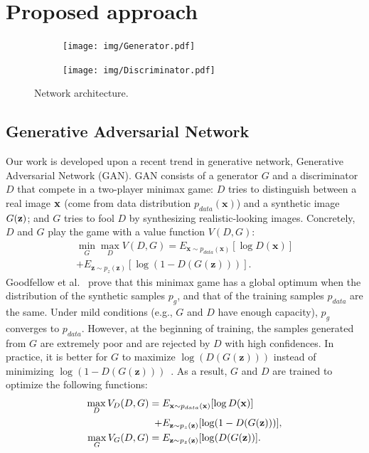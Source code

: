\documentclass[10pt,twocolumn,letterpaper]{article}
\begin{document}
\section{Proposed approach}
\begin{figure} [t!]
    \centering
    \begin{subfigure}[b]{0.48\textwidth}
        \texttt{[image: img/Generator.pdf]}
    \end{subfigure}
    \begin{subfigure}[b]{0.48\textwidth}
        \texttt{[image: img/Discriminator.pdf]}
    \end{subfigure}
    \vspace{-0.16in}
    \caption{\small Network architecture.}
    \vspace{-0.2in}
   \label{fig:concept}
\end{figure}


\subsection{Generative Adversarial Network} 

Our work is developed upon a recent trend in generative network, Generative Adversarial Network (GAN). GAN consists of a generator $G$ and a discriminator $D$ that compete in a two-player
minimax game: $D$ tries to distinguish between a real image $\bf{x}$ (come from data distribution $p_{data}(\mathbf{x})$) and a synthetic image $G(\bf{z})$; and $G$ tries to fool $D$ by synthesizing realistic-looking images. 
Concretely, $D$ and $G$ play the game with a value function $V(D,G)$:
\vspace{-1mm}
\begin{align}
\min_{G} \max_{D} V(D,G) =  E_{\mathbf{x} \sim p_{data}(\mathbf{x})} [\log D(\mathbf{x})] \nonumber \\ 
+  E_{\mathbf{z} \sim p_{z}(\mathbf{z})} [\log(1- D(G(\mathbf{z}))) ].
\end{align}
Goodfellow et al.~\cite{goodfellow2014generative} prove that this minimax game has
a global optimum when the distribution of the synthetic samples $p_{g}$, and that of the training samples $p_{data}$ are the same. 
Under mild conditions (e.g., $G$ and $D$ have enough capacity), $p_{g}$ converges to $p_{data}$. 
However, at the beginning of training, the samples generated from $G$ are extremely poor and are rejected by $D$ with high confidences. 
In practice, it is better for $G$ to maximize $\log(D(G(\mathbf{z})))$ instead of minimizing $\log \left( 1 - D(G(\mathbf{z})) \right)$~\cite{goodfellow2014generative}. 
As a result, $G$ and $D$ are trained to optimize the following functions:
\begin{align}
\max_{D} V_D(D,G) = {} & E_{\mathbf{x} \sim p_{data}(\mathbf{x})} [\log D({\bf{x}})] \nonumber \\ 
+ & E_{\mathbf{z} \sim p_{z}(\mathbf{z})} [\log(1- D(G(\mathbf{z}))) ], \\
\max_{G} V_G(D,G) = {} & E_{\mathbf{z} \sim p_{z}(\mathbf{z})} [\log(D(G(\mathbf{z})) ].
\end{align}
\end{document}
